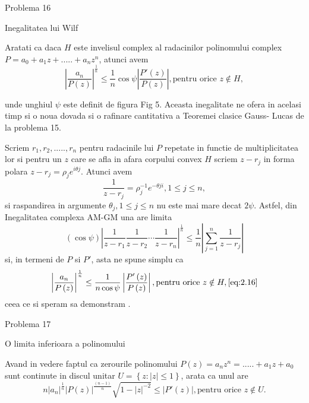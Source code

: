 \documentclass[a4paper,12pt,oneside]{report}
\begin{document}
Problema 16 

Inegalitatea lui Wilf 

Aratati ca daca \(H\) este invelisul complex al radacinilor polinomului complex \(P = a_{0} + a_{1}z + ..... +a_{n}z^{n}\), atunci avem 
\begin{displaymath}
  \left | \frac{a_{n}}{P\left ( z \right )} \right |^{\frac{1}{n}}\leq \frac{1}n\cos{\psi }\left | \frac{{P}'\left ( z \right )}{P\left ( z \right )} \right | , \text{pentru orice } z\notin H, \label{eq:2.16} \tag{2.16}
\end{displaymath}
 

unde unghiul \(\psi\) este definit de figura Fig 5. Aceasta inegalitate ne ofera in acelasi timp si o noua dovada si o rafinare cantitativa  a Teoremei clasice Gauss- Lucas de la problema 15. 

Scriem \(r_{1} , r_{2} ,.....,r_{n}\) pentru radacinile lui \(P\) repetate in functie de multiplicitatea lor si pentru un \(z\) care se afla in afara corpului convex \(H\) scriem \(z - r_{j}\) in forma polara \(z - r_{j} = \rho _{j}e^{i\theta j}\). Atunci avem 
\begin{displaymath}
  \frac{1}{z - r_{j}} = \rho _{j}^{-1}e^{-\theta ji} , 1 \leq  j \leq  n,
\end{displaymath}
si raspandirea in argumente \(\theta _{j}, 1 \leq j\leq n\) nu este mai mare decat \(2\psi\). Astfel, din Inegalitatea complexa AM-GM una are limita 
\begin{displaymath}
  \left ( \cos\psi  \right )\left | \frac{1}{z - r_{1}} \frac{1}{z - r_{2}}\cdots \frac{1}{z - r_{n}} \right|^{\frac{1}{n}} \leq  \frac{1}{n} \left | \sum_{j = 1}^{n}\frac{1}{z - r_{j}} \right |
\end{displaymath}
si, in termeni de \(P\) si \({P}'\), asta ne spune simplu ca 
\begin{displaymath}
   \left | \frac{a_{n}}{P\left ( z \right )} \right |^{\frac{1}{n}}\leq \frac{1}{n\cos\psi }\left | \frac{{P}'\left ( z \right )}{P\left ( z \right )} \right |,  \text{pentru orice }z \notin H, \ref{eq:2.16}
\end{displaymath}
 ceea ce si speram sa demonstram .

Problema 17

O limita inferioara a polinomului 

Avand in vedere faptul ca zerourile polinomului \(P\left ( z \right ) = a_{n}z^{n} =.....+a_{1}z + a_{0}\) sunt continute in discul unitar \(U= \left \{ z: \left | z \right |\leq 1 \right \}\), arata ca unul are
\begin{displaymath}
    n\left | a_{n} \right |^{\frac{1}{n}}\left | P\left ( z \right ) \right |^{\frac{\left ( n-1 \right )}{n}}\sqrt{1 - \left | z \right |^{-2}}\leq \left | {P}'\left ( z \right ) \right |, \text{pentru orice } z\notin U. \label{eq:2.17} \tag{2.17}
\end{displaymath}
\end{document}
